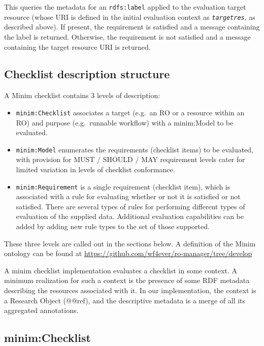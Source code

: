 \documentclass[]{article}
\begin{document}
This queries the metadata for an \texttt{rdfs:label} applied to the
evaluation target resource (whose URI is defined in the initial
evaluation context as \emph{\texttt{targetres}}, as described above). If
present, the requirement is satisfied and a message containing the label
is returned. Otherwise, the requirement is not satisfied and a message
containing the target resource URI is returned.

\subsection{Checklist description structure}

A Minim checklist contains 3 levels of description:

\begin{itemize}
\itemsep1pt\parskip0pt
\item
  \texttt{minim:Checklist} associates a target (e.g.~an RO or a resource
  within an RO) and purpose (e.g.~runnable workflow) with a minim:Model
  to be evaluated.
\item
  \texttt{minim:Model} enumerates the requirements (checklist items) to
  be evaluated, with provision for MUST / SHOULD / MAY requirement
  levels cater for limited variation in levels of checklist conformance.
\item
  \texttt{minim:Requirement} is a single requirement (checklist item),
  which is associated with a rule for evaluating whether or not it is
  satisfied or not satisfied. There are several types of rules for
  performing different types of evaluation of the supplied data.
  Additional evaluation capabilities can be added by adding new rule
  types to the set of those supported.
\end{itemize}

These three levels are called out in the sections below. A definition of
the Minim ontology can be found at
\href{}{https://github.com/wf4ever/ro-manager/tree/develop}

A minim checklist implementation evaluates a checklist in some context.
A minimum realization for such a context is the presence of some RDF
metadata describing the resources associated with it. In our
implementation, the context is a Research Object (@@ref), and the
descriptive metadata is a merge of all its aggregated annotations.

\subsection{minim:Checklist}
\end{document}
